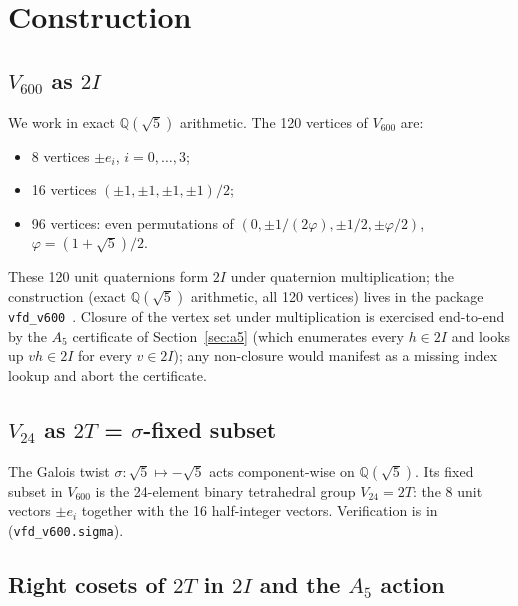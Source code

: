 \documentclass[11pt]{article}
\newcommand{\Vsix}{V_{600}}
\newcommand{\Vtwentyfour}{V_{24}}
\newcommand{\Phigold}{\varphi}
\newcommand{\twoI}{2I}
\newcommand{\twoT}{2T}
\theoremstyle{plain}
\theoremstyle{definition}
\begin{document}
\section{Construction}

\subsection{$\Vsix$ as $\twoI$}

We work in exact $\mathbb{Q}(\sqrt5)$ arithmetic.  The 120 vertices
of $\Vsix$ are:
\begin{itemize}
  \item 8 vertices $\pm e_i$, $i=0,\dots,3$;
  \item 16 vertices $(\pm 1,\pm 1,\pm 1,\pm 1)/2$;
  \item 96 vertices: even permutations of
        $(0,\pm 1/(2\Phigold),\pm 1/2,\pm \Phigold/2)$,
        $\Phigold=(1+\sqrt5)/2$.
\end{itemize}
These 120 unit quaternions form $\twoI$ under quaternion
multiplication; the construction (exact $\mathbb{Q}(\sqrt5)$
arithmetic, all 120 vertices) lives in the package
\texttt{vfd\_v600}~\cite{Vsixprog}.  Closure of the vertex set under
multiplication is exercised end-to-end by the $A_5$ certificate of
Section~\ref{sec:a5} (which enumerates every $h\in\twoI$ and looks up
$v h\in\twoI$ for every $v\in\twoI$); any non-closure would manifest
as a missing index lookup and abort the certificate.

\subsection{$\Vtwentyfour$ as $\twoT$ = $\sigma$-fixed subset}

The Galois twist $\sigma\colon\sqrt5\mapsto-\sqrt5$ acts component-wise
on $\mathbb{Q}(\sqrt5)$.  Its fixed subset in $\Vsix$ is the
24-element binary tetrahedral group $\Vtwentyfour = \twoT$: the 8
unit vectors $\pm e_i$ together with the 16 half-integer vectors.
Verification is in~\cite{Vsixprog} (\texttt{vfd\_v600.sigma}).

\subsection{Right cosets of $\twoT$ in $\twoI$ and the $A_5$ action}\label{sec:cosets}
\end{document}

